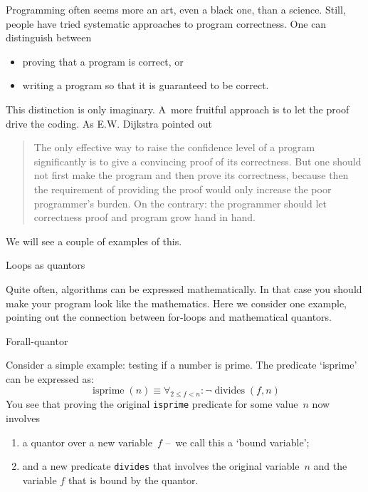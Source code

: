 
Programming often seems more an art, even a black one,
than a science. Still, people have tried
systematic approaches to program correctness.
One can distinguish between
\begin{itemize}
\item proving that a program is correct, or
\item writing a program so that it is guaranteed to be correct.
\end{itemize}
This distinction is only imaginary. A~more fruitful approach
is to let the proof drive the coding.
As E.W. Dijkstra pointed out
\begin{quotation}
  The only effective way to raise the confidence level of a program
  significantly is to give a convincing proof of its correctness. But
  one should not first make the program and then prove its correctness,
  because then the requirement of providing the proof would only
  increase the poor programmer’s burden. On the contrary: the programmer
  should let correctness proof and program grow hand in hand.
\end{quotation}

We will see a couple of examples of this.

 {Loops as quantors}


Quite often, algorithms can be expressed mathematically.
In that case you should make your program look like the mathematics.
Here we consider one example,
pointing out the connection between for-loops
and mathematical quantors.

 {Forall-quantor}

Consider a simple example: testing if a number is prime.
The predicate `isprime' can be expressed as:
\[
\mathop{\mathrm{isprime}}(n) \equiv
\forall_{2\leq f<n}\colon \neg\mathop{\mathrm{divides}}(f,n)
\]
You see that proving the original \lstinline{isprime} predicate
for some value~$n$ now involves 
\begin{enumerate}
\item a quantor over a new variable~$f$ --~we call this a `bound variable';
\item and a new predicate \lstinline{divides} that involves the original
  variable~$n$ and the variable $f$ that is bound by the quantor.
\end{enumerate}

